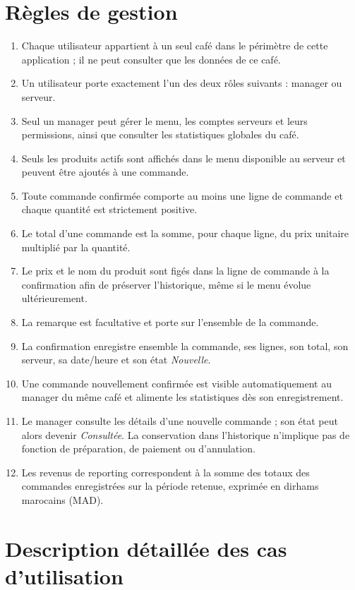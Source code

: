 \documentclass[11pt,a4paper]{article}
\begin{document}
\section{Règles de gestion}
\begin{enumerate}[label=\textbf{RG-\arabic*}]
  \item Chaque utilisateur appartient à un seul café dans le périmètre de cette application ; il ne peut consulter que les données de ce café.
  \item Un utilisateur porte exactement l’un des deux rôles suivants : manager ou serveur.
  \item Seul un manager peut gérer le menu, les comptes serveurs et leurs permissions, ainsi que consulter les statistiques globales du café.
  \item Seuls les produits actifs sont affichés dans le menu disponible au serveur et peuvent être ajoutés à une commande.
  \item Toute commande confirmée comporte au moins une ligne de commande et chaque quantité est strictement positive.
  \item Le total d’une commande est la somme, pour chaque ligne, du prix unitaire multiplié par la quantité.
  \item Le prix et le nom du produit sont figés dans la ligne de commande à la confirmation afin de préserver l’historique, même si le menu évolue ultérieurement.
  \item La remarque est facultative et porte sur l’ensemble de la commande.
  \item La confirmation enregistre ensemble la commande, ses lignes, son total, son serveur, sa date/heure et son état \emph{Nouvelle}.
  \item Une commande nouvellement confirmée est visible automatiquement au manager du même café et alimente les statistiques dès son enregistrement.
  \item Le manager consulte les détails d’une nouvelle commande ; son état peut alors devenir \emph{Consultée}. La conservation dans l’historique n’implique pas de fonction de préparation, de paiement ou d’annulation.
  \item Les revenus de reporting correspondent à la somme des totaux des commandes enregistrées sur la période retenue, exprimée en dirhams marocains (MAD).
\end{enumerate}

\section{Description détaillée des cas d’utilisation}
\end{document}
